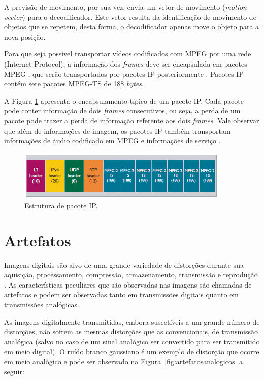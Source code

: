 A previsão de movimento, por sua vez, envia um vetor de movimento (\emph{motion vector}) para o decodificador. Este vetor resulta da identificação de movimento de objetos que se repetem, desta forma, o decodificador apenas move o objeto para a nova posição.

Para que seja possível transportar vídeos codificados com MPEG por uma rede  (Internet Protocol), a informação dos \emph{frames} deve ser encapsulada em pacotes MPEG-, que serão transportados por pacotes IP posteriormente \cite{ciscoieee}. Pacotes IP contém sete pacotes MPEG-TS de 188 \emph{bytes}. 

A Figura \ref{fig:ts} apresenta o encapsulamento típico de um pacote IP. Cada pacote pode conter informação de dois \emph{frames} consecutivos, ou seja, a perda de um pacote pode trazer a perda de informação referente aos dois \emph{frames}. Vale observar que além de informações de imagem, os pacotes IP também transportam informações de áudio codificado em MPEG e informações de serviço \cite{ciscoieee}.

\begin{figure}[!htb]
	\centering
	\includegraphics[width=0.9\textwidth]{./imgs/ts.png}
	\caption{Estrutura de pacote IP.}
	\label{fig:ts}
\end{figure}

\section{Artefatos}

Imagens digitais são alvo de uma grande variedade de distorções durante sua aquisição, processamento, compressão, armazenamento, transmissão e reprodução \cite{wangbovik2004}. As características peculiares que são observadas nas imagens são chamadas de artefatos \cite{albini} e podem ser observadas tanto em transmissões digitais quanto em transmissões analógicas.

As imagens digitalmente transmitidas, embora suscetíveis a um grande número de distorções, não sofrem as mesmas distorções que as convencionais, de transmissão analógica (salvo no caso de um sinal analógico ser convertido para ser transmitido em meio digital). O ruído branco gaussiano é um exemplo de distorção que ocorre em meio analógico e pode ser observado na Figura~\ref{fig:artefatosanalogicos} a seguir:

